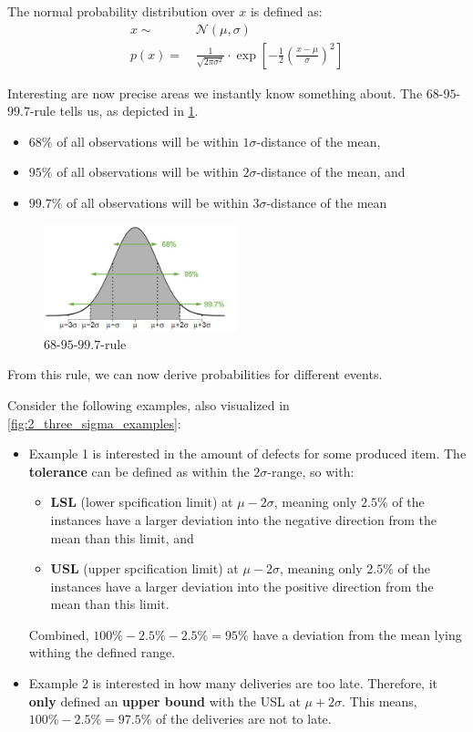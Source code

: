 The normal probability distribution over $x$ is defined as:
\begin{align*}
  x \sim&\, \mathcal{N}(\mu, \sigma) \\
  p(x) = &\,\frac{1}{\sqrt{2\pi \sigma^2}} \cdot \exp\left[ -\frac{1}{2}\left(\frac{x-\mu}{\sigma}\right)^2 \right]
\end{align*}

Interesting are now precise areas we instantly know something about. The $68$-$95$-$99.7$-rule tells us, as depicted in \ref{fig:2_three_sigma}.
\begin{itemize}
  \item $68\%$ of all observations will be within $1\sigma$-distance of the mean,
  \item $95\%$ of all observations will be within $2\sigma$-distance of the mean, and
  \item $99.7\%$ of all observations will be within $3\sigma$-distance of the mean
\end{itemize}

\begin{figure}[H]
  \centering
  \includegraphics[width=0.5\textwidth]{assets/visualization_and_extraction/norm_rule.png}
  \caption{$68$-$95$-$99.7$-rule}
  \label{fig:2_three_sigma}
\end{figure}

From this rule, we can now derive probabilities for different events. \begin{note}Consider the following examples, also visualized in \ref{fig:2_three_sigma_examples}:
\begin{itemize}
  \item Example 1 is interested in the amount of defects for some produced item. The \textbf{tolerance} can be defined as within the $2\sigma$-range, so with:
  \begin{itemize}
    \item \textbf{LSL} (lower spcification limit) at $\mu-2\sigma$, meaning only $2.5\%$ of the instances have a larger deviation into the negative direction from the mean than this limit, and
    \item \textbf{USL} (upper spcification limit) at $\mu-2\sigma$, meaning only $2.5\%$ of the instances have a larger deviation into the positive direction from the mean than this limit.
  \end{itemize}
  Combined, $100\%-2.5\%-2.5\%=95\%$ have a deviation from the mean lying withing the defined range.
  \item Example 2 is interested in how many deliveries are too late. Therefore, it \textbf{only} defined an \textbf{upper bound} with the USL at $\mu+2\sigma$. This means, $100\%-2.5\%=97.5\%$ of the deliveries are not to late.
\end{itemize}
\end{note}

